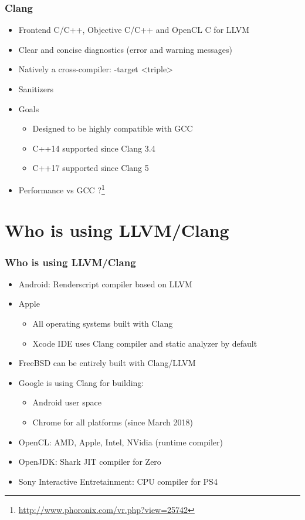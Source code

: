 \documentclass{smilebeamer}
\begin{document}
\begin{frame}
\frametitle{Clang}
\begin{itemize}
  \item Frontend C/C++, Objective C/C++ and OpenCL C for LLVM
  \item Clear and concise diagnostics (error and warning messages)
  \item Natively a cross-compiler: {\selectfont -target <triple>}
  \item Sanitizers
  \item Goals
  \begin{itemize}
    \item Designed to be highly compatible with GCC
    \item C++14 supported since Clang 3.4
    \item C++17 supported since Clang 5
  \end{itemize}
  \item Performance vs GCC ?\footnote{\url{http://www.phoronix.com/vr.php?view=25742}}
\end{itemize}
\end{frame}
\section{Who is using LLVM/Clang}

\begin{frame}
\frametitle{Who is using LLVM/Clang}
\begin{itemize}
  \item Android: Renderscript compiler based on LLVM
  \item Apple
  \begin{itemize}
    \item All operating systems built with Clang
    \item Xcode IDE uses Clang compiler and static analyzer by default
  \end{itemize}
  \item FreeBSD can be entirely built with Clang/LLVM
  \item Google is using Clang for building:
  \begin{itemize}
    \item Android user space
    \item Chrome for all platforms (since March 2018)
  \end{itemize}
  \item OpenCL: AMD, Apple, Intel, NVidia (runtime compiler)
  \item OpenJDK: Shark JIT compiler for Zero
  \item Sony Interactive Entretainment: CPU compiler for PS4
\end{itemize}
\end{frame}
\end{document}
